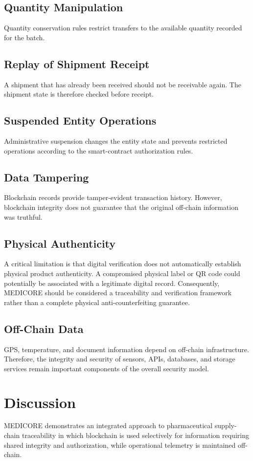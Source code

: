 \documentclass[11pt,a4paper]{article}
\begin{document}
\subsection{Quantity Manipulation}
Quantity conservation rules restrict transfers to the available quantity recorded for the batch.

\subsection{Replay of Shipment Receipt}
A shipment that has already been received should not be receivable again. The shipment state is therefore checked before receipt.

\subsection{Suspended Entity Operations}
Administrative suspension changes the entity state and prevents restricted operations according to the smart-contract authorization rules.

\subsection{Data Tampering}
Blockchain records provide tamper-evident transaction history. However, blockchain integrity does not guarantee that the original off-chain information was truthful.

\subsection{Physical Authenticity}
A critical limitation is that digital verification does not automatically establish physical product authenticity. A compromised physical label or QR code could potentially be associated with a legitimate digital record. Consequently, MEDICORE should be considered a traceability and verification framework rather than a complete physical anti-counterfeiting guarantee.

\subsection{Off-Chain Data}
GPS, temperature, and document information depend on off-chain infrastructure. Therefore, the integrity and security of sensors, APIs, databases, and storage services remain important components of the overall security model.

\section{Discussion}
MEDICORE demonstrates an integrated approach to pharmaceutical supply-chain traceability in which blockchain is used selectively for information requiring shared integrity and authorization, while operational telemetry is maintained off-chain.
\end{document}
